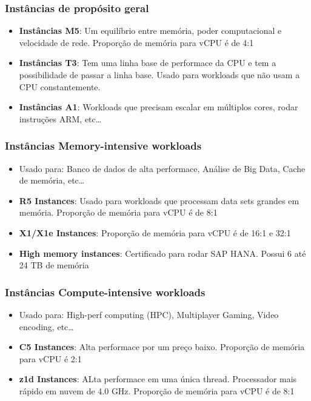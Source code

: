 \begin{frame}
	\frametitle{Instâncias de propósito geral}
	\begin{itemize}
		\item \textbf{Instâncias M5}: Um equilíbrio entre memória, poder computacional e velocidade de rede. Proporção de memória para vCPU é de 4:1
		\item \textbf{Instâncias T3}: Tem uma linha base de performace da CPU e tem a possibilidade de passar a linha base. Usado para workloads que não usam a CPU constantemente.
		\item \textbf{Instâncias A1}: Workloads que precisam escalar em múltiplos cores, rodar instruções ARM, etc\dots
	\end{itemize}
\end{frame}

\begin{frame}
	\frametitle{Instâncias Memory-intensive workloads}
	\begin{itemize}
		\item Usado para: Banco de dados de alta performace, Análise de Big Data, Cache de memória, etc\dots
		\item \textbf{R5 Instances}: Usado para workloads que processam data sets grandes em memória. Proporção de memória para vCPU é de 8:1
		\item \textbf{X1/X1e Instances}: Proporção de memória para vCPU é de 16:1 e 32:1
		\item \textbf{High memory instances}: Certificado para rodar SAP HANA. Possui 6 até 24 TB de memória
	\end{itemize}
\end{frame}

\begin{frame}
	\frametitle{Instâncias Compute-intensive workloads}
	\begin{itemize}
		\item Usado para: High-perf computing (HPC), Multiplayer Gaming, Video encoding, etc\dots
		\item \textbf{C5 Instances}: Alta performace por um preço baixo. Proporção de memória para vCPU é 2:1
		\item \textbf{z1d Instances}: ALta performace em uma única thread. Processador mais rápido em nuvem de 4.0 GHz. Proporção de memória para vCPU é de 8:1
	\end{itemize}
\end{frame}

